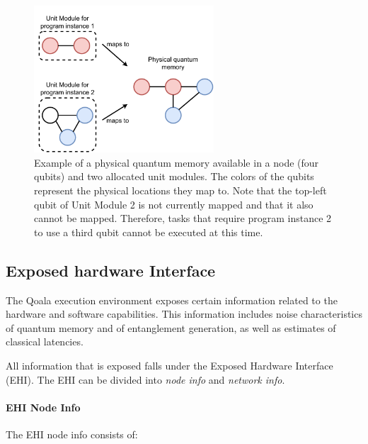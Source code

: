 \begin{figure}[t]
    \centering
    \includegraphics[width=0.6\textwidth]{figures/qoala/unit_module.pdf}
    \caption{Example of a physical quantum memory available in a node (four qubits) and two allocated unit modules. The colors of the qubits represent the physical locations they map to. Note that the top-left qubit of Unit Module 2 is not currently mapped and that it also cannot be mapped. Therefore, tasks that require program instance 2 to use a third qubit cannot be executed at this time.}
    \label{qoala:fig:app:unit_module}
\end{figure}



\subsection{Exposed hardware Interface}
\label{qoala:sec:app:ehi}
The Qoala execution environment exposes certain information related to the hardware and software capabilities.
This information includes noise characteristics of quantum memory and of entanglement generation, as well as estimates of classical latencies.

All information that is exposed falls under the Exposed Hardware Interface (EHI).
The EHI can be divided into \textit{node info} and \textit{network info}.


\paragraph{EHI Node Info}
The EHI node info consists of:


